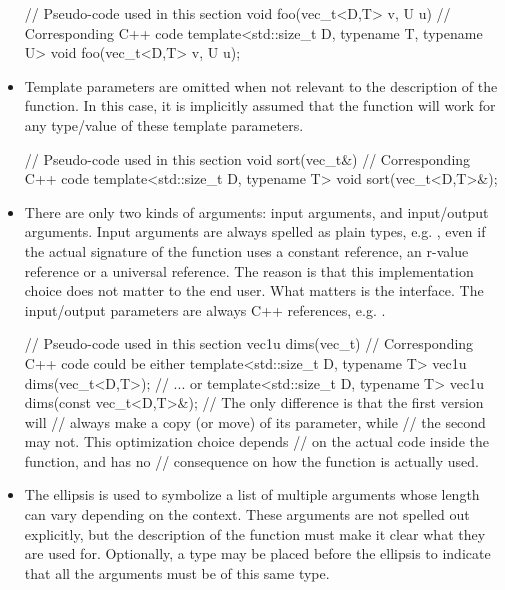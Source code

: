 \documentclass[12pt]{report}
\newenvironment{example}
{
    \begin{mdframed}[style=example,frametitle={Example}]
}
{
    \end{mdframed}
}
\begin{document}
\begin{itemize}
\begin{example}
\begin{cppcode}
// Pseudo-code used in this section
void foo(vec_t<D,T> v, U u)
// Corresponding C++ code
template<std::size_t D, typename T, typename U>
void foo(vec_t<D,T> v, U u);
\end{cppcode}
\end{example}

\item Template parameters are omitted when not relevant to the description of the function. In this case, it is implicitly assumed that the function will work for any type/value of these template parameters.

\begin{example}
\begin{cppcode}
// Pseudo-code used in this section
void sort(vec_t&)
// Corresponding C++ code
template<std::size_t D, typename T>
void sort(vec_t<D,T>&);
\end{cppcode}
\end{example}

\item There are only two kinds of arguments: input arguments, and input/output arguments. Input arguments are always spelled as plain types, e.g. , even if the actual signature of the function uses a constant reference, an r-value reference or a universal reference. The reason is that this implementation choice does not matter to the end user. What matters is the interface. The input/output parameters are always C++ references, e.g. .

\begin{example}
\begin{cppcode}
// Pseudo-code used in this section
vec1u dims(vec_t)
// Corresponding C++ code could be either
template<std::size_t D, typename T>
vec1u dims(vec_t<D,T>);
// ... or
template<std::size_t D, typename T>
vec1u dims(const vec_t<D,T>&);
// The only difference is that the first version will
// always make a copy (or move) of its parameter, while
// the second may not. This optimization choice depends
// on the actual code inside the function, and has no
// consequence on how the function is actually used.
\end{cppcode}
\end{example}

\item The ellipsis  is used to symbolize a list of multiple arguments whose length can vary depending on the context. These arguments are not spelled out explicitly, but the description of the function must make it clear what they are used for. Optionally, a type may be placed before the ellipsis to indicate that all the arguments must be of this same type.


\end{itemize}
\end{document}
